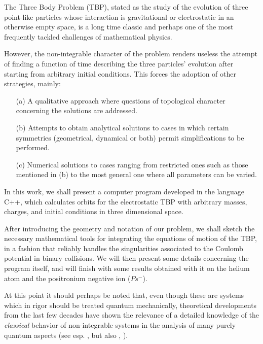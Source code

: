 \documentclass[thmsa]{article}
\begin{document}
The Three Body Problem (TBP), stated as the study of the evolution of three
point-like particles whose interaction is gravitational or electrostatic in
an otherwise empty space, is a long time classic and perhaps one of the most
frequently tackled challenges of mathematical physics.

However, the non-integrable character of the problem renders useless the
attempt of finding a function of time describing the three particles'
evolution after starting from arbitrary initial conditions. This forces the
adoption of other strategies, mainly:

\begin{enumerate}
\item[(a)]  A qualitative approach where questions of topological character
concerning the solutions are addressed.

\item[(b)]  Attempts to obtain analytical solutions to cases in which
certain symmetries (geometrical, dynamical or both) permit simplifications
to be performed.

\item[(c)]  Numerical solutions to cases ranging from restricted ones such
as those mentioned in (b) to the most general one where all parameters can
be varied.
\end{enumerate}

In this work, we shall present a computer program developed in the language
C++, which calculates orbits for the electrostatic TBP with arbitrary
masses, charges, and initial conditions in three dimensional space.

After introducing the geometry and notation of our problem, we shall sketch
the necessary mathematical tools for integrating the equations of motion of
the TBP, in a fashion that reliably handles the singularities associated to
the Coulomb potential in binary collisions. We will then present some
details concerning the program itself, and will finish with some results
obtained with it on the helium atom and the positronium negative ion ($%
Ps^{-} $)\allowbreak \allowbreak .

At this point it should perhaps be noted that, even though these are systems
which in rigor should be treated quantum mechanically, theoretical
developments from the last few decades have shown the relevance of a
detailed knowledge of the \emph{classical} behavior of non-integrable
systems in the analysis of many purely quantum aspects (see esp. \cite
{Gutzwiller}, but also \cite{Delande}, \cite{Nauenberg}).
\end{document}
